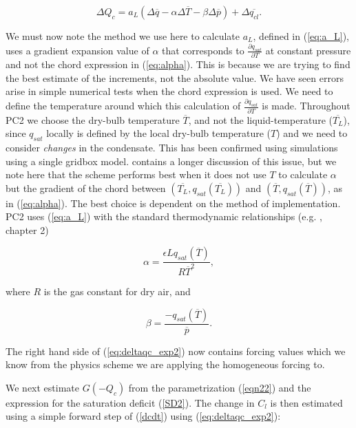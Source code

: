 \documentclass{UMDP_article}
\begin{document}
\begin{equation}
\Delta{Q_c} = a_L ( \Delta{\overline{q}} - \alpha \Delta{\overline{T}}
- \beta \Delta{\overline{p}} ) +  \Delta{\overline{q_{cl}}} .
\label{eq:deltaqc_exp2}
\end{equation}

We must now note the method we use here to calculate $a_L$, defined in
(\ref{eq:a_L}), uses a gradient expansion
value of $\alpha$ that corresponds to $\frac{\partial{q_{sat}}}
{\partial{T}}$ at
constant pressure and not the chord expression in (\ref{eq:alpha}). This
is because we are trying to find the best estimate of the increments, not
the absolute value. We have seen errors arise in simple numerical
tests when the chord expression is used.
We need to define the
temperature around which this calculation of
$\frac{\partial{q_{sat}}}{\partial{T}}$
is made.  Throughout PC2 we choose the dry-bulb temperature $\overline{T}$, and not the
liquid-temperature ($\overline{T_L}$), since $q_{sat}$ locally is
defined by the local dry-bulb temperature ($T$) and we need to consider
\textit{changes} in the condensate. This has been confirmed using
simulations using a single gridbox model.  contains
a longer discussion of this issue, but we note here that the \cite{smith90} scheme
performs best when it does not use $T$ to calculate $\alpha$
but the gradient of the chord between $(\overline{T_L}, q_{sat}(\overline{T_L}))$ and
$(\overline{T}, q_{sat}(\overline{T}))$, as in (\ref{eq:alpha}). The best choice is
dependent on the method of implementation.
PC2 uses (\ref{eq:a_L}) with the standard
thermodynamic relationships (e.g. \cite{ry89}, chapter 2)

\begin{equation}
\alpha = \frac{ \epsilon L q_{sat}(\overline{T}) } { R \overline{T}^2} ,
\label{eq:alpha_exp}
\end{equation}

where $R$ is the gas constant for dry air, and

\begin{equation}
\beta = \frac{-q_{sat}(\overline{T})}{\overline{p}} .
\label{eq:beta}
\end{equation}

The right hand side of (\ref{eq:deltaqc_exp2}) now contains forcing
values which we
know from the physics scheme we are applying the homogeneous forcing to.

We next estimate $G(-Q_c)$ from the parametrization (\ref{eqn22}) and the
expression for the saturation deficit (\ref{SD2}). The change in $C_l$ is then
estimated using a simple forward step of (\ref{dcdt}) using
(\ref{eq:deltaqc_exp2}):
\end{document}
